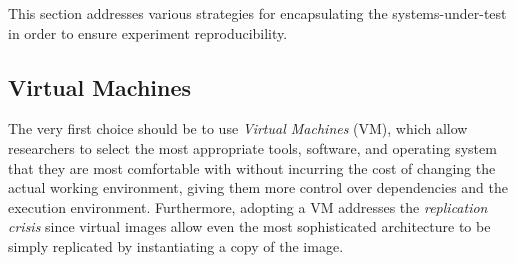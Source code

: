 






This section addresses various strategies for encapsulating the systems-under-test in order to ensure experiment reproducibility.

\subsection{Virtual Machines}
The very first choice should be to use \emph{Virtual Machines} (VM), which allow researchers to select the most appropriate tools, software, and operating system that they are most comfortable with without incurring the cost of changing the actual working environment, giving them more control over dependencies and the execution environment.
Furthermore, adopting a VM addresses the \emph{replication crisis} since virtual images allow even the most sophisticated architecture to be simply replicated by instantiating a copy of the image.

